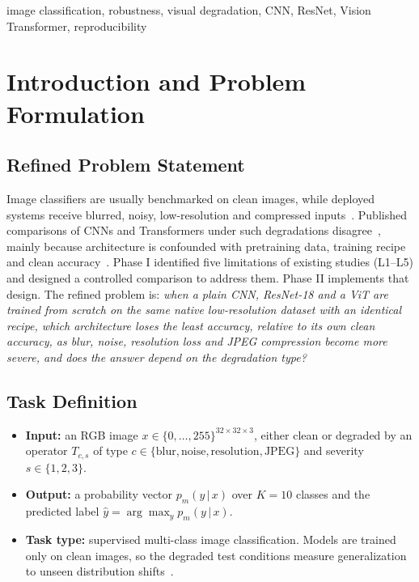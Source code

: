 \documentclass[conference]{IEEEtran}
\begin{document}
\begin{IEEEkeywords}
image classification, robustness, visual degradation, CNN, ResNet, Vision Transformer, reproducibility
\end{IEEEkeywords}

\section{Introduction and Problem Formulation}

\subsection{Refined Problem Statement}
Image classifiers are usually benchmarked on clean images, while deployed systems receive blurred, noisy, low-resolution and compressed inputs~\cite{hendrycks2019}. Published comparisons of CNNs and Transformers under such degradations disagree~\cite{bai2021,wang2023,liu2024}, mainly because architecture is confounded with pretraining data, training recipe and clean accuracy~\cite{erkara2026,liu2024}. Phase I identified five limitations of existing studies (L1--L5) and designed a controlled comparison to address them. Phase II implements that design. The refined problem is: \emph{when a plain CNN, ResNet-18 and a ViT are trained from scratch on the same native low-resolution dataset with an identical recipe, which architecture loses the least accuracy, relative to its own clean accuracy, as blur, noise, resolution loss and JPEG compression become more severe, and does the answer depend on the degradation type?}

\subsection{Task Definition}
\begin{itemize}
\item \textbf{Input:} an RGB image $x \in \{0,\dots,255\}^{32\times32\times3}$, either clean or degraded by an operator $T_{c,s}$ of type $c \in \{\text{blur}, \text{noise}, \text{resolution}, \text{JPEG}\}$ and severity $s \in \{1,2,3\}$.
\item \textbf{Output:} a probability vector $p_m(y\,|\,x)$ over $K = 10$ classes and the predicted label $\hat{y} = \arg\max_y p_m(y\,|\,x)$.
\item \textbf{Task type:} supervised multi-class image classification. Models are trained only on clean images, so the degraded test conditions measure generalization to unseen distribution shifts~\cite{hendrycks2019}.
\end{itemize}
\end{document}

